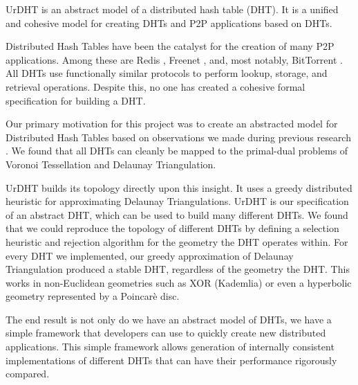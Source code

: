 \documentclass[11pt,conference]{IEEEtran}
\begin{document}
UrDHT is an abstract model of a distributed hash table (DHT). %
It is a unified and cohesive model for creating DHTs and P2P applications based on DHTs.
%

Distributed Hash Tables have been the catalyst for the creation of many P2P applications.
Among these are Redis \cite{redis}, Freenet \cite{freenet}, and, most notably, BitTorrent \cite{bittorrent}. 
All DHTs use functionally similar protocols to perform lookup, storage, and retrieval operations.
Despite this, no one has created a cohesive formal specification for building a DHT.

Our primary motivation for this project was to create an abstracted model for Distributed Hash Tables based on observations we made during previous research \cite{dgvh}.
We found that all DHTs can cleanly be mapped to the primal-dual problems of Voronoi Tessellation and Delaunay Triangulation.

UrDHT builds its topology directly upon this insight.
It uses a greedy distributed heuristic for approximating Delaunay Triangulations.
UrDHT is our specification of an abstract DHT, which can be used to build many different DHTs.
We found that we could reproduce the topology of different DHTs by defining a selection heuristic and rejection algorithm for the geometry the DHT operates within.
For every DHT we implemented, our greedy approximation of Delaunay Triangulation produced a stable DHT, regardless of the geometry the DHT.  
This works in non-Euclidean geometries such as XOR (Kademlia) or even a hyperbolic geometry represented by a Poincar\`{e} disc.

The end result is not only do we have an abstract model of DHTs, we have a simple framework that developers can use to quickly create new distributed applications.
This simple framework allows generation of internally consistent implementations of different DHTs that can have their performance rigorously compared.  %
\end{document}
